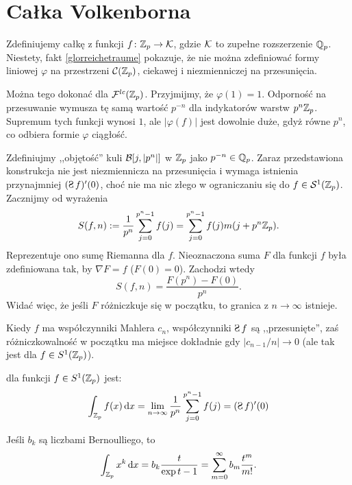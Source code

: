 \section{Całka Volkenborna}
Zdefiniujemy całkę z funkcji $f \colon \mathbb Z_p \to \mathcal K$, gdzie $\mathcal K$ to zupełne rozszerzenie $\mathbb Q_p$.
Niestety, fakt \ref{glorreichetraume} pokazuje, że nie można zdefiniować formy liniowej $\varphi$ na przestrzeni $\mathcal C(\mathbb Z_p)$, ciekawej i  niezmienniczej na przesunięcia. %

Można tego dokonać dla $\mathcal F^{lc}(\mathbb Z_p)$.
Przyjmijmy, że $\varphi(1) = 1$.
Odporność na przesuwanie wymusza tę samą wartość $p^{-n}$ dla indykatorów warstw $p^n \mathbb Z_p$.
Supremum tych funkcji wynosi $1$, ale $|\varphi(f)|$ jest dowolnie duże, gdyż równe $p^n$, co odbiera formie $\varphi$ ciągłość.

Zdefiniujmy ,,objętość'' kuli $\mathcal B[j, |p^n|]$ w $\mathbb Z_p$ jako $p^{-n} \in \mathbb Q_p$.
Zaraz przedstawiona konstrukcja nie jest niezmiennicza na przesunięcia i wymaga istnienia przynajmniej $(\suma f)'(0)$, choć nie ma nic złego w ograniczaniu się do $f \in \mathcal S^1(\mathbb Z_p)$.
Zacznijmy od wyrażenia
\[
	S(f, n) := \frac{1}{p^n}\sum_{j=0}^{p^n-1} f(j) = \sum_{j=0}^{p^n-1} f(j) m(j+p^n\mathbb Z_p).
\]
Reprezentuje ono sumę Riemanna dla $f$.
Nieoznaczona suma $F$ dla funkcji $f$ była zdefiniowana tak, by $\nabla F = f$ ($F(0) = 0$).
Zachodzi wtedy
\[
	S(f, n) = \frac{F(p^n) - F(0)}{p^n}.
\]
Widać więc, że jeśli $F$ różniczkuje się w początku, to granica z $n \to \infty$ istnieje.

Kiedy $f$ ma współczynniki Mahlera $c_n$, współczynniki $\suma f$ są ,,przesunięte'', zaś różniczkowalność w początku ma miejsce dokładnie gdy $|c_{n-1}/n| \to 0$ (ale tak jest dla $f \in S^1(\mathbb Z_p)$). %

\begin{definicja}
 dla funkcji $f \in S^1(\mathbb Z_p)$ jest:
\[
	\int_{\Z_p} f(x) \,\textrm{d}x = \lim_{n\to \infty} \frac{1}{p^n} \sum_{j=0}^{p^n-1} f(j) = (\suma f)'(0)
\]
\end{definicja}

\begin{przyklad}
	Jeśli $b_k$ są liczbami Bernoulliego, to
	\[
		\intzp x^k \,\textrm{d}x = b_k \hfill \frac{t}{\exp t - 1} = \sum_{m = 0}^\infty b_m \frac{t^m}{m!}.
	\]
\end{przyklad}

